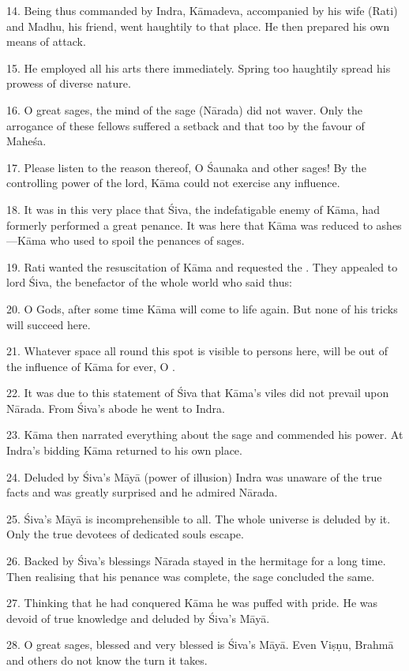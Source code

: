 14. Being thus commanded by Indra, Kāmadeva, accompanied by his wife (Rati) and
Madhu, his friend, went haughtily to that place. He then prepared his own means
of attack.

15. He employed all his arts there immediately. Spring too haughtily spread his
prowess of diverse nature.

16. O great sages, the mind of the sage (Nārada) did not waver. Only
the arrogance of these fellows suffered a setback and that too by the favour
of Maheśa.

17. Please listen to the reason thereof, O Śaunaka and other sages! By
the controlling power of the lord, Kāma could not exercise any influence.

18. It was in this very place that Śiva, the indefatigable enemy of Kāma, had
formerly performed a great penance. It was here that Kāma was reduced to
ashes—Kāma who used to spoil the penances of sages.

19. Rati wanted the resuscitation of Kāma and requested the . They
appealed to lord Śiva, the benefactor of the whole world who said thus:

20. O Gods, after some time Kāma will come to life again. But none of his
tricks will succeed here.

21. Whatever space all round this spot is visible to persons here, will be out
of the influence of Kāma for ever, O .

22. It was due to this statement of Śiva that Kāma’s viles did not prevail upon
Nārada. From Śiva’s abode he went to Indra.

23. Kāma then narrated everything about the sage and commended his power. At
Indra’s bidding Kāma returned to his own place.

24. Deluded by Śiva’s Māyā (power of illusion) Indra was unaware of the true
facts and was greatly surprised and he admired Nārada.

25. Śiva’s Māyā is incomprehensible to all. The whole universe is deluded by it.
Only the true devotees of dedicated souls escape.

26. Backed by Śiva’s blessings Nārada stayed in the hermitage for a long time.
Then realising that his penance was complete, the sage concluded the same.

27. Thinking that he had conquered Kāma he was puffed with pride. He was devoid
of true knowledge and deluded by Śiva’s Māyā.

28. O great sages, blessed and very blessed is Śiva’s Māyā. Even Viṣṇu, Brahmā
and others do not know the turn it takes.


